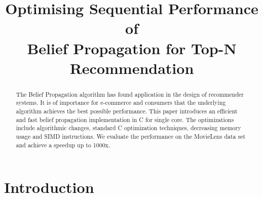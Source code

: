 \documentclass[letterpaper]{article}
\title{Optimising Sequential Performance of\\ Belief Propagation for Top-N Recommendation}
\newcommand{\mypar}[1]{{\bf #1.}}
\begin{document}
%
\maketitle
%


\begin{abstract}

The Belief Propagation algorithm has found application in the design of recommender systems. It is of importance for e-commerce and consumers that the underlying algorithm achieves the best possible performance. This paper introduces an efficient and fast belief propagation implementation in C for single core. The optimizations include algorithmic changes, standard C optimization techniques, decreasing memory usage and SIMD instructions. We evaluate the performance on the MovieLens data set and achieve a speedup up to 1000x.
\end{abstract}

\section{Introduction}\label{sec:intro}

\end{document}

